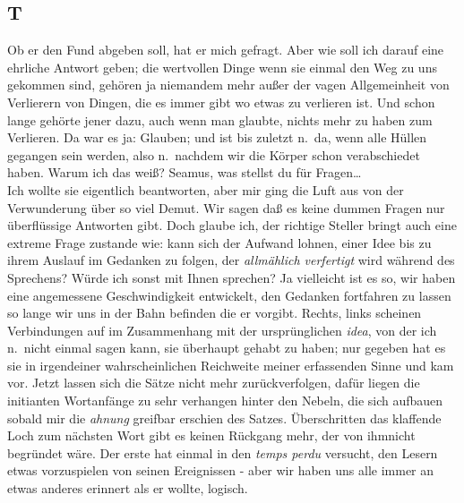 \documentclass[
]{article}
\author{}
\date{\vspace{-2.5em}}
\begin{document}
\subsection{T}\label{t}

Ob er den Fund abgeben soll, hat er mich gefragt. Aber wie soll ich
darauf eine ehrliche Antwort geben; die wertvollen Dinge wenn sie einmal
den Weg zu uns gekommen sind, gehören ja niemandem mehr außer der vagen
Allgemeinheit von Verlierern von Dingen, die es immer gibt wo etwas zu
verlieren ist. Und schon lange gehörte jener dazu, auch wenn man
glaubte, nichts mehr zu haben zum Verlieren. Da war es ja: Glauben; und
ist bis zuletzt n.~da, wenn alle Hüllen gegangen sein werden, also
n.~nachdem wir die Körper schon verabschiedet haben. Warum ich das weiß?
Seamus, was stellst du für Fragen\ldots{}\\
Ich wollte sie eigentlich beantworten, aber mir ging die Luft aus von
der Verwunderung über so viel Demut. Wir sagen daß es keine dummen
Fragen nur überflüssige Antworten gibt. Doch glaube ich, der richtige
Steller bringt auch eine extreme Frage zustande wie: kann sich der
Aufwand lohnen, einer Idee bis zu ihrem Auslauf im Gedanken zu folgen,
der \emph{allmählich verfertigt} wird während des Sprechens? Würde ich
sonst mit Ihnen sprechen? Ja vielleicht ist es so, wir haben eine
angemessene Geschwindigkeit entwickelt, den Gedanken fortfahren zu
lassen so lange wir uns in der Bahn befinden die er vorgibt. Rechts,
links scheinen Verbindungen auf im Zusammenhang mit der ursprünglichen
\emph{idea}, von der ich n.~nicht einmal sagen kann, sie überhaupt
gehabt zu haben; nur gegeben hat es sie in irgendeiner wahrscheinlichen
Reichweite meiner erfassenden Sinne und kam vor. Jetzt lassen sich die
Sätze nicht mehr zurückverfolgen, dafür liegen die initianten
Wortanfänge zu sehr verhangen hinter den Nebeln, die sich aufbauen
sobald mir die \emph{ahnung} greifbar erschien des Satzes. Überschritten
das klaffende Loch zum nächsten Wort gibt es keinen Rückgang mehr, der
von ihmnicht begründet wäre. Der erste hat einmal in den \emph{temps
perdu} versucht, den Lesern etwas vorzuspielen von seinen Ereignissen -
aber wir haben uns alle immer an etwas anderes erinnert als er wollte,
logisch.
\end{document}
